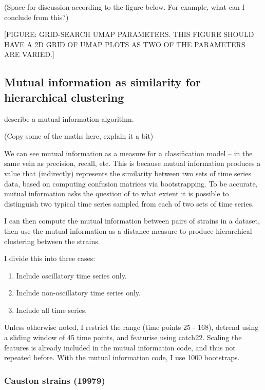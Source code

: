 (Space for discussion according to the figure below.  For example, what can I conclude from this?)

[FIGURE: GRID-SEARCH UMAP PARAMETERS.  THIS FIGURE SHOULD HAVE A 2D GRID OF UMAP PLOTS AS TWO OF THE PARAMETERS ARE VARIED.]

\subsection{Mutual information as similarity for hierarchical clustering}
\label{subsec:analysis-clustering-mi}

\parencite{granadosDistributedDynamicIntracellular2018} describe a mutual information algorithm.

(Copy some of the maths here, explain it a bit)

We can see mutual information as a measure for a classification model -- in the same vein as precision, recall, etc.  This is because mutual information produces a value that (indirectly) represents the similarity between two sets of time series data, based on computing confusion matrices via bootstrapping.  To be accurate, mutual information asks the question of to what extent it is possible to distinguish two typical time series sampled from each of two sets of time series.

I can then compute the mutual information between pairs of strains in a dataset, then use the mutual information as a distance measure to produce hierarchical clustering between the strains.

I divide this into three cases:
\begin{enumerate}
\item Include oscillatory time series only.
\item Include non-oscillatory time series only.
\item Include all time series.
\end{enumerate}

Unless otherwise noted, I restrict the range (time points 25 - 168), detrend using a sliding window of 45 time points, and featurise using catch22.  Scaling the features is already included in the mutual information code, and thus not repeated before.  With the mutual information code, I use 1000 bootstraps.

\subsubsection{Causton strains (19979)}
\label{sec:org14969a0}

